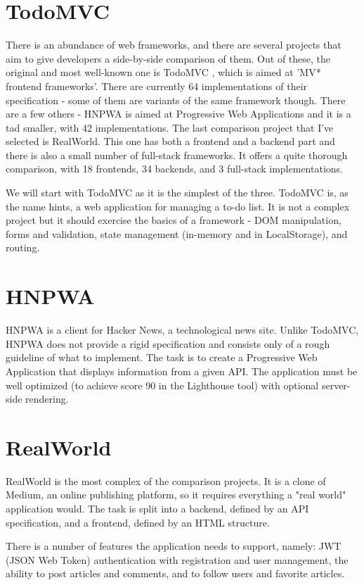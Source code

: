\documentclass[english,odsaz]{fitthesis}
\begin{document}
\section{TodoMVC}
\label{sec:orgd76c4f0}
There is an abundance of web frameworks, and there are several projects that aim
to give developers a side-by-side comparison of them. Out of these, the original
and most well-known one is TodoMVC \cite{todomvc}, which is aimed at 'MV* frontend
frameworks'. There are currently 64 implementations of their specification -
some of them are variants of the same framework though. There are a few others -
HNPWA is aimed at Progressive Web Applications and it is a tad smaller, with 42
implementations. The last comparison project that I've selected is
RealWorld. This one has both a frontend and a backend part and there is also a
small number of full-stack frameworks. It offers a quite thorough comparison,
with 18 frontends, 34 backends, and 3 full-stack implementations.

We will start with TodoMVC as it is the simplest of the three. TodoMVC is, as
the name hints, a web application for managing a to-do list. It is not a complex
project but it should exercise the basics of a framework - DOM manipulation,
forms and validation, state management (in-memory and in LocalStorage), and
routing.

\section{HNPWA}
\label{sec:org2ab6f6e}
HNPWA \cite{hnpwa} is a client for Hacker News, a technological news site. Unlike TodoMVC,
HNPWA does not provide a rigid specification and consists only of a rough
guideline of what to implement. The task is to create a Progressive Web
Application that displays information from a given API. The application must be
well optimized (to achieve score 90 in the Lighthouse tool) with optional
server-side rendering.

\section{RealWorld}
\label{sec:org1374089}
RealWorld \cite{realworld} is the most complex of the comparison projects. It is a clone of
Medium, an online publishing platform, so it requires everything a "real world"
application would. The task is split into a backend, defined by an API
specification, and a frontend, defined by an HTML structure.

There is a number of features the application needs to support, namely: JWT
(JSON Web Token) authentication with registration and user management, the
ability to post articles and comments, and to follow users and favorite articles.
\end{document}

